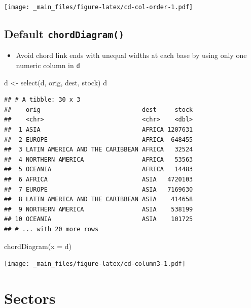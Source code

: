 \documentclass[
]{book}
\newenvironment{Shaded}{\begin{snugshade}}{\end{snugshade}}
\newcommand{\AttributeTok}[1]{\textcolor[rgb]{0.77,0.63,0.00}{#1}}
\newcommand{\FunctionTok}[1]{\textcolor[rgb]{0.00,0.00,0.00}{#1}}
\newcommand{\NormalTok}[1]{#1}
\newcommand{\OtherTok}[1]{\textcolor[rgb]{0.56,0.35,0.01}{#1}}
\providecommand{\tightlist}{%
  \setlength{\itemsep}{0pt}\setlength{\parskip}{0pt}}
\begin{document}
\texttt{[image: \_main\_files/figure-latex/cd-col-order-1.pdf]}

\hypertarget{default-chorddiagram-2}{%
\subsection{\texorpdfstring{Default \texttt{chordDiagram()}}{Default chordDiagram()}}\label{default-chorddiagram-2}}

\begin{itemize}
\tightlist
\item
  Avoid chord link ends with unequal widths at each base by using only one numeric column in \texttt{d}
\end{itemize}

\begin{Shaded}
\begin{Highlighting}[]
\NormalTok{d }\OtherTok{\textless{}{-}} \FunctionTok{select}\NormalTok{(d, orig, dest, stock)}
\NormalTok{d}
\end{Highlighting}
\end{Shaded}

\begin{verbatim}
## # A tibble: 30 x 3
##    orig                            dest     stock
##    <chr>                           <chr>    <dbl>
##  1 ASIA                            AFRICA 1207631
##  2 EUROPE                          AFRICA  648455
##  3 LATIN AMERICA AND THE CARIBBEAN AFRICA   32524
##  4 NORTHERN AMERICA                AFRICA   53563
##  5 OCEANIA                         AFRICA   14483
##  6 AFRICA                          ASIA   4720103
##  7 EUROPE                          ASIA   7169630
##  8 LATIN AMERICA AND THE CARIBBEAN ASIA    414658
##  9 NORTHERN AMERICA                ASIA    538199
## 10 OCEANIA                         ASIA    101725
## # ... with 20 more rows
\end{verbatim}

\begin{Shaded}
\begin{Highlighting}[]
\FunctionTok{chordDiagram}\NormalTok{(}\AttributeTok{x =}\NormalTok{ d)}
\end{Highlighting}
\end{Shaded}

\texttt{[image: \_main\_files/figure-latex/cd-column3-1.pdf]}

\hypertarget{sectors}{%
\section{Sectors}\label{sectors}}
\end{document}
